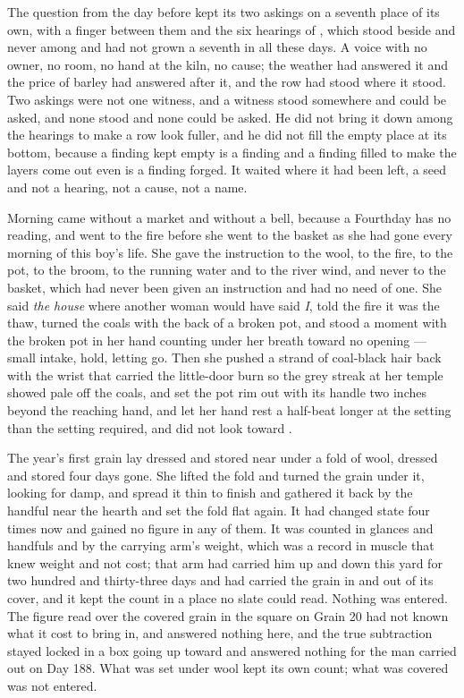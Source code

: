 The question from the day before kept its two askings on a seventh place of its own, with a finger between them and the six hearings of , which stood beside and never among and had not grown a seventh in all these days. A voice with no owner, no room, no hand at the kiln, no cause; the weather had answered it and the price of barley had answered after it, and the row had stood where it stood. Two askings were not one witness, and a witness stood somewhere and could be asked, and none stood and none could be asked. He did not bring it down among the hearings to make a row look fuller, and he did not fill the empty place at its bottom, because a finding kept empty is a finding and a finding filled to make the layers come out even is a finding forged. It waited where it had been left, a seed and not a hearing, not a cause, not a name.

\scenebreak

Morning came without a market and without a bell, because a Fourthday has no reading, and  went to the fire before she went to the basket as she had gone every morning of this boy's life. She gave the instruction to the wool, to the fire, to the pot, to the broom, to the running water and to the river wind, and never to the basket, which had never been given an instruction and had no need of one. She said \emph{the house} where another woman would have said \emph{I}, told the fire it was the thaw, turned the coals with the back of a broken pot, and stood a moment with the broken pot in her hand counting under her breath toward no opening --- small intake, hold, letting go. Then she pushed a strand of coal-black hair back with the wrist that carried the little-door burn so the grey streak at her temple showed pale off the coals, and set the pot rim out with its handle two inches beyond the reaching hand, and let her hand rest a half-beat longer at the setting than the setting required, and did not look toward .

The year's first grain lay dressed and stored near  under a fold of wool, dressed and stored four days gone. She lifted the fold and turned the grain under it, looking for damp, and spread it thin to finish and gathered it back by the handful near the hearth and set the fold flat again. It had changed state four times now and gained no figure in any of them. It was counted in glances and handfuls and by the carrying arm's weight, which was a record in muscle that knew weight and not cost; that arm had carried him up and down this yard for two hundred and thirty-three days and had carried the grain in and out of its cover, and it kept the count in a place no slate could read. Nothing was entered. The figure read over the covered grain in the square on Grain 20 had not known what it cost to bring in, and answered nothing here, and the true subtraction stayed locked in a box going up toward  and answered nothing for the man carried out on Day 188. What was set under wool kept its own count; what was covered was not entered.


